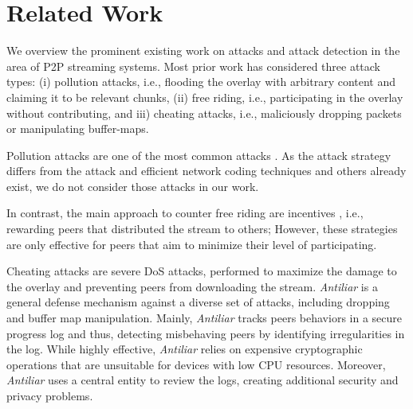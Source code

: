 \section{Related Work}
\label{sec:related}

We overview the prominent existing work on attacks and attack detection in the area of P2P streaming systems. Most prior work has considered three attack types: (i) pollution attacks, i.e., flooding the overlay with arbitrary content and claiming it to be relevant chunks, (ii) free riding, i.e., participating in the overlay without contributing, and iii) cheating attacks, i.e., maliciously dropping packets or manipulating buffer-maps. 

Pollution attacks are one of the most common attacks \cite{pollution1}. 
As the attack strategy differs from the \drop attack and efficient network coding techniques \cite{nc} and others \cite{pollution2} already exist, we do not consider those attacks in our work.

In contrast, the main approach to counter free riding are incentives \cite{defending,defending2}, i.e., rewarding peers that distributed the stream to others; 
However, these strategies are only effective for peers that aim to minimize their level of participating. 

Cheating attacks are severe DoS attacks, performed to maximize the damage to the overlay and preventing peers from downloading the stream.   
\textit{Antiliar} is a general defense mechanism against a diverse set of attacks, including dropping and buffer map manipulation\cite{antiliar}.
Mainly, \textit{Antiliar} tracks peers behaviors in a secure progress log and thus, detecting misbehaving peers by identifying irregularities in the log. 
While highly effective, \textit{Antiliar} relies on expensive cryptographic operations that are unsuitable for devices with low CPU resources.
Moreover, \textit{Antiliar} uses a central entity to review the logs, creating additional security and privacy problems. 

